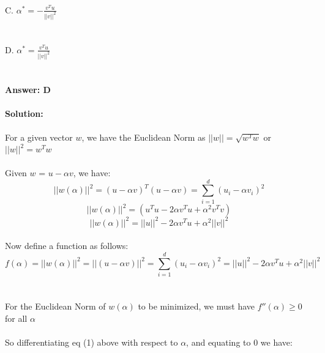 \documentclass[prl,twocolumn,showpacs,preprintnumbers,superscriptaddress]{revtex4}
\theoremstyle{plain}
\theoremstyle{definition}
\begin{document}
\begin{widetext}
\\
\\
\\
C. $\alpha^* = - {\frac{v^Tu}{||v||^2}}$
\\
\\
\\
D. $\alpha^* = {\frac{v^Tu}{||v||^2}}$
\\
\\
\\
\textbf{Answer: D}
\\
\\
\textbf{Solution:}\ 
\\
\\
For a given vector $w$, we have the Euclidean Norm as $||w|| = \sqrt{w^Tw}$ or $||w||^2 = w^Tw$
\\
\\
Given $w$ = $u - \alpha v$, we have:
\begin{equation}
    ||w(\alpha)||^2 = {(u - \alpha v)}^T{(u - \alpha v)} = \sum_{i=1}^d (u_{i} - \alpha v_{i})^2 {}\nonumber
\end{equation}
\begin{equation}
    ||w(\alpha)||^2 = {(u^Tu - 2\alpha v^Tu + \alpha^2v^Tv)} {}\nonumber
\end{equation}
\begin{equation}
    ||w(\alpha)||^2 = ||u||^2 - 2\alpha v^Tu + \alpha^2||v||^2 %
\end{equation}
\\
Now define a function as follows:
\begin{equation}
    f(\alpha) = ||w(\alpha)||^2 = ||(u - \alpha v)||^2 = \sum_{i=1}^d (u_{i} - \alpha v_{i})^2 = ||u||^2 - 2\alpha v^Tu + \alpha^2||v||^2
\end{equation}
\\
\\
For the Euclidean Norm of $w(\alpha)$ to be minimized, we must have $f''(\alpha) \ge 0$ for all $\alpha$
\\
\\
So differentiating eq (1) above with respect to $\alpha$, and equating to $0$ we have:
\begin{equation}

\end{equation}
\end{widetext}
\end{document}
